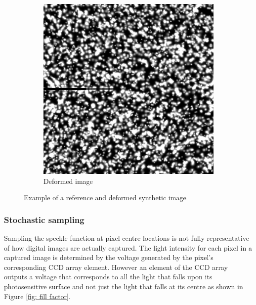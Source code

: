 \documentclass[12pt,oneside,openany,a4paper, %
english, %
masters-t, goldenblock]{usthesis}
\begin{document}
\begin{figure}
\begin{subfigure}[t]{0.45\textwidth}
\includegraphics[scale=0.2]{image_002}
\caption{Deformed image}
\label{fig: deformed image synthetic}
\end{subfigure}
\caption{Example of a reference and deformed synthetic image}
\label{fig: synthetic images}
\end{figure}


\subsubsection{Stochastic sampling}
Sampling the speckle function at pixel centre locations is not fully representative of how digital images are actually captured. The light intensity for each pixel in a captured image is determined by the voltage generated by the pixel's corresponding CCD array element. However an element of the CCD array outputs a voltage that corresponds to all the light that falls upon its photosensitive surface and not just the light that falls at its centre as shown in Figure \ref{fig: fill factor}.
\end{document}
